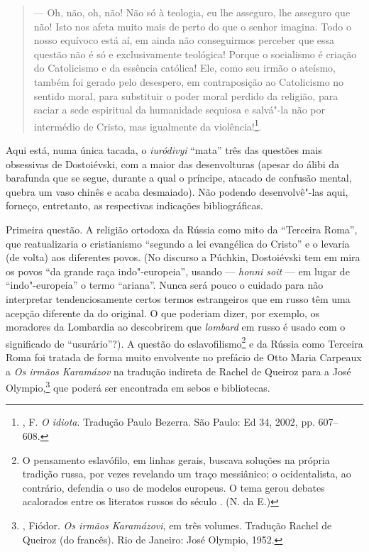 \begin{quote}
--- Oh, não, oh, não! Não só à teologia, eu lhe asseguro, lhe asseguro que não! Isto nos afeta muito mais de perto do que o senhor
imagina. Todo o nosso equívoco está aí, em ainda não conseguirmos perceber que essa questão não é só e exclusivamente teológica! Porque o socialismo é criação do Catolicismo e da essência católica! Ele, como seu irmão o ateísmo, também foi gerado pelo desespero, em contraposição ao Catolicismo no sentido moral, para substituir o poder moral perdido da religião, para saciar a sede espiritual da humanidade sequiosa e salvá"-la não por intermédio de Cristo, mas igualmente da violência!\footnote{, F. \emph{O idiota}. Tradução Paulo Bezerra. São Paulo: Ed 34, 2002, pp. 607--608.}.
\end{quote}

Aqui está, numa única tacada, o \emph{iuródivyi} ``mata'' três das questões mais obsessivas de Dostoiévski, com a maior das desenvolturas (apesar do álibi da barafunda que se segue, durante a qual o príncipe, atacado de confusão mental, quebra um vaso chinês e acaba desmaiado). Não podendo desenvolvê"-las aqui, forneço, entretanto, as respectivas indicações bibliográficas.

Primeira questão. A religião ortodoxa da Rússia como mito da
``Terceira Roma'', que reatualizaria o cristianismo ``segundo
a lei evangélica do Cristo'' e o levaria (de volta) aos
diferentes povos. (No discurso a Púchkin, Dostoiévski tem em
mira os povos ``da grande raça indo"-europeia'', usando ---
\emph{honni soit} --- em lugar de ``indo"-europeia'' o termo
``ariana''. Nunca será pouco o cuidado para não interpretar
tendenciosamente certos termos estrangeiros que em russo têm
uma acepção diferente da do original. O que poderiam dizer,
por exemplo, os moradores da Lombardia ao descobrirem que
\emph{lombard} em russo é usado com o significado de
``usurário''?). A questão do eslavofilismo\footnote{O
pensamento eslavófilo, em linhas gerais, buscava soluções
na própria tradição russa, por vezes revelando um traço
messiânico; o ocidentalista, ao contrário, defendia o uso
de modelos europeus. O tema gerou debates acalorados entre
os literatos russos do século . (N. da E.)} e
da Rússia como Terceira Roma foi tratada de forma muito
envolvente no prefácio de Otto Maria Carpeaux a \emph{Os
irmãos Karamázov} na tradução indireta de Rachel de Queiroz
para a José Olympio,\footnote{, Fiódor.
\emph{Os irmãos Karamázovi}, em três volumes. Tradução Rachel
de Queiroz (do francês). Rio de Janeiro: José Olympio, 1952.}
que poderá ser encontrada em sebos e bibliotecas.

